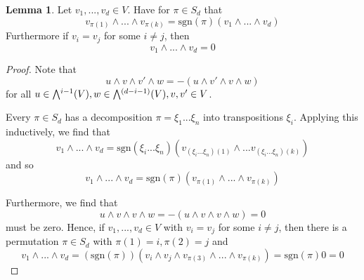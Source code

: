 \documentclass{scrartcl}
\newcommand{\sgn}{\mathrm{sgn}}
\newcommand{\extpow}{\mathchoice{{\textstyle\bigwedge}}
    {{\bigwedge}}
    {{\textstyle\wedge}}
    {{\scriptstyle\wedge}}}
\theoremstyle{definition}
\newtheorem{lemma}[subsection]{Lemma}
\begin{document}
\begin{lemma}
    \label{prop:basic_properties_exterior_product}
    Let $v_1, ..., v_d \in V$. Have for $\pi \in S_d$ that
    \begin{equation*}
        v_{\pi(1)} \wedge ... \wedge v_{\pi(k)} = \sgn(\pi) (v_1 \wedge ... \wedge v_d)
    \end{equation*}
    Furthermore if $v_i = v_j$ for some $i \neq j$, then
    \begin{equation*}
        v_1 \wedge ... \wedge v_d = 0
    \end{equation*}
\end{lemma}
\begin{proof}
    Note that
    \begin{equation*}
        u \wedge v \wedge v' \wedge w = -(u \wedge v' \wedge v \wedge w)
    \end{equation*}
    for all $u \in \extpow^{i - 1}(V), w \in \extpow^{(d - i - 1)}(V), v, v' \in V$.

    Every $\pi \in S_d$ has a decomposition $\pi = \xi_1 ... \xi_n$ into transpositions $\xi_i$.
    Applying this inductively, we find that
    \begin{equation*}
        v_1 \wedge ... \wedge v_d = \sgn(\xi_i ... \xi_n) (v_{(\xi_i ... \xi_n)(1)} \wedge ... v_{(\xi_i ... \xi_n)(k)})
    \end{equation*}
    and so
    \begin{equation*}
        v_1 \wedge ... \wedge v_d = \sgn(\pi) (v_{\pi(1)} \wedge ... \wedge v_{\pi(k)})
    \end{equation*}

    Furthermore, we find that
    \begin{equation*}
        u \wedge v \wedge v \wedge w = -(u \wedge v \wedge v \wedge w) = 0
    \end{equation*}
    must be zero.
    Hence, if $v_1, ..., v_d \in V$ with $v_i = v_j$ for some $i \neq j$, then there is a permutation $\pi \in S_d$ with $\pi(1) = i, \pi(2) = j$ and
    \begin{equation*}
        v_1 \wedge ... \wedge v_d = (\sgn(\pi))(v_i \wedge v_j \wedge v_{\pi(3)} \wedge ... \wedge v_{\pi(k)}) = \sgn(\pi) 0 = 0
    \end{equation*}
\end{proof}
\end{document}
